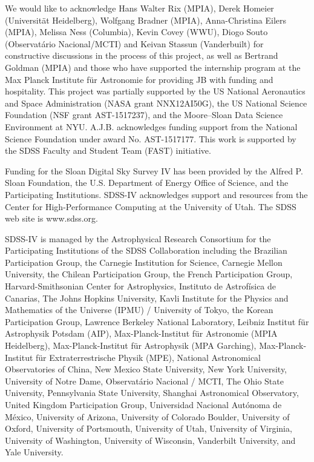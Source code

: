 \documentclass[twocolumn]{aastex62}
\begin{document}
\acknowledgements
We would like to acknowledge Hans Walter Rix (MPIA), Derek Homeier (Universit{\"a}t Heidelberg), Wolfgang Bradner (MPIA), Anna-Christina Eilers (MPIA), Melissa Ness (Columbia), Kevin Covey (WWU), Diogo Souto (Observatário Nacional/MCTI) and Keivan Stassun (Vanderbuilt) for constructive discussions in the process of this project, as well as Bertrand Goldman (MPIA) and those who have supported the internship program at the Max Planck Institute f{\"u}r Astronomie for providing JB with funding and hospitality.
This project was partially supported by
the US National Aeronautics and Space Administration (NASA grant NNX12AI50G),
the US National Science Foundation (NSF grant AST-1517237),
and the Moore--Sloan Data Science Environment at NYU.
A.J.B. acknowledges funding support from the National Science Foundation under award No. AST-1517177.
This work is supported by the SDSS Faculty and Student Team (FAST) initiative.

Funding for the Sloan Digital Sky Survey IV has been provided by the Alfred P. Sloan Foundation, the U.S. Department of Energy Office of Science, and the Participating Institutions. SDSS-IV acknowledges support and resources from the Center for High-Performance Computing at
the University of Utah. The SDSS web site is www.sdss.org.

SDSS-IV is managed by the Astrophysical Research Consortium for the 
Participating Institutions of the SDSS Collaboration including the 
Brazilian Participation Group, the Carnegie Institution for Science, 
Carnegie Mellon University, the Chilean Participation Group, the French Participation Group, Harvard-Smithsonian Center for Astrophysics, 
Instituto de Astrof\'isica de Canarias, The Johns Hopkins University, 
Kavli Institute for the Physics and Mathematics of the Universe (IPMU) / 
University of Tokyo, the Korean Participation Group, Lawrence Berkeley National Laboratory, 
Leibniz Institut f\"ur Astrophysik Potsdam (AIP),  
Max-Planck-Institut f\"ur Astronomie (MPIA Heidelberg), 
Max-Planck-Institut f\"ur Astrophysik (MPA Garching), 
Max-Planck-Institut f\"ur Extraterrestrische Physik (MPE), 
National Astronomical Observatories of China, New Mexico State University, 
New York University, University of Notre Dame, 
Observat\'ario Nacional / MCTI, The Ohio State University, 
Pennsylvania State University, Shanghai Astronomical Observatory, 
United Kingdom Participation Group,
Universidad Nacional Aut\'onoma de M\'exico, University of Arizona, 
University of Colorado Boulder, University of Oxford, University of Portsmouth, 
University of Utah, University of Virginia, University of Washington, University of Wisconsin, 
Vanderbilt University, and Yale University.
\end{document}
